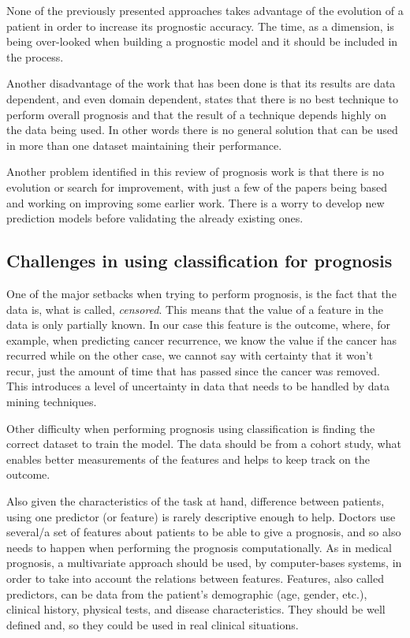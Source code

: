 None of the previously presented approaches takes advantage of the evolution of a patient in order to increase its prognostic
 accuracy. The time, as a dimension, is being over-looked when building a prognostic model and it should be included in the process.

Another disadvantage of the work that has been done is that its results are data dependent, and even domain dependent, \cite{Endo2008}
 states that there is no best technique to perform overall prognosis and that the result of a technique depends highly on the data 
 being used. In other words there is no general solution that can be used in more than one dataset maintaining their performance.

Another problem identified in this review of prognosis work is that there is no evolution or search for improvement, with
 just a few of the papers being based and working on improving some earlier work. There is a worry to develop new prediction 
 models before validating the already existing ones.
 
 \subsection{Challenges in using classification for prognosis}
 \label{subsection:difficulties}
 
One of the major setbacks when trying to perform prognosis, is the fact that the data is, what is called, \emph{censored}. This means that 
the value of a feature in the data is only partially known. In our case this feature is the outcome, where, for example, when 
predicting cancer recurrence, we know the value if the cancer has recurred while on the other case, we cannot say with certainty 
that it won't recur, just the amount of time that has passed since the cancer was removed. This introduces a level of uncertainty in data that needs to be handled by data mining techniques.

Other difficulty when performing prognosis using classification is finding the correct dataset to train the model. The data
 should be from a cohort study, what enables better measurements of the features and helps to keep track on the outcome.

Also given the characteristics of the task at hand, difference between patients, using one predictor (or feature) is rarely 
descriptive enough to help. Doctors use several/a set of features about patients to be able to give a prognosis, and so 
also needs to happen when performing the prognosis computationally. As in medical prognosis, a multivariate approach should
 be used, by computer-bases systems, in order to take into account the relations between features. Features, also called
  predictors, can be data from the patient’s demographic (age, gender, etc.), clinical history, physical tests, and
   disease characteristics. They should be well defined and, so they could be used in real clinical situations.

\cleardoublepage